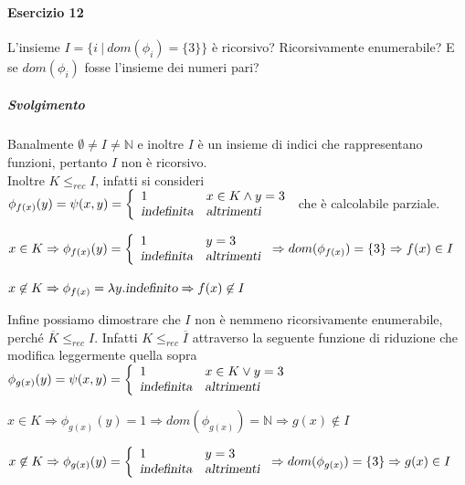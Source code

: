 \documentclass[10pt]{book}
\begin{document}
\paragraph{Esercizio 12} L'insieme $I = \{i\:|\:dom(\phi_i) = \{3\}\}$ è ricorsivo? Ricorsivamente enumerabile? E se $dom(\phi_i)$ fosse l'insieme dei numeri pari?
\subparagraph{Svolgimento} Banalmente $\emptyset\neq I \neq \mathbb{N}$ e inoltre $I$ è un insieme di indici che rappresentano funzioni, pertanto $I$ non è ricorsivo.\\
Inoltre $K\leq_{rec} I$, infatti si consideri $\phi_{f(x)}(y) = \psi(x,y) = \left\{ \begin{array}{l l}
1&x\in K \wedge y = 3\\
\textsl{indefinita}&\textsl{altrimenti}
\end{array}\right.$ che è calcolabile parziale.\\
\begin{list}{}{}
	\item $x\in K \Rightarrow \phi_{f(x)}(y) = \left\{\begin{array}{l l}
		1&y = 3\\
		\textsl{indefinita}&\textsl{altrimenti}
	\end{array}\right. \Rightarrow dom(\phi_{f(x)}) = \{3\}\Rightarrow f(x) \in I$
	\item $x\not\in K \Rightarrow \phi_{f(x)} = \lambda y.\textsl{indefinito} \Rightarrow f(x)\not\in I$
\end{list}
Infine possiamo dimostrare che $I$ non è nemmeno ricorsivamente enumerabile, perché $\overline{K}\leq_{rec} I$. Infatti $K\leq_{rec}\overline{I}$ attraverso la seguente funzione di riduzione che modifica leggermente quella sopra\\$\phi_{g(x)}(y) = \psi(x,y) = \left\{ \begin{array}{l l}
1&x\in K \vee y = 3\\
\textsl{indefinita}&\textsl{altrimenti}
\end{array}\right.$
\begin{list}{}{}
	\item $x\in K\Rightarrow \phi_{g(x)}(y) = 1 \Rightarrow dom(\phi_{g(x)}) = \mathbb{N} \Rightarrow g(x) \not\in I$
	\item $x\not\in K \Rightarrow \phi_{g(x)}(y) = \left\{\begin{array}{l l}
		1&y = 3\\
		\textsl{indefinita}&\textsl{altrimenti}
	\end{array}\right. \Rightarrow dom(\phi_{g(x)}) = \{3\}\Rightarrow g(x) \in I$
\end{list}
\end{document}

